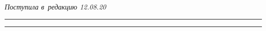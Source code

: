 \vspace*{-3pt}





\hfill{\small\textit{Поступила в~редакцию 12.08.20}}








\vspace*{6pt}





\hrule





\vspace*{2pt}















\hrule





\vspace*{8pt}





\def\tit{ASSESSMENT OF~THE~EFFECT OF~PROCESSES\\ AND~THREADS AFFINITY 


IN~IBM POWER COMPUTING SYSTEMS ON~THE~PARALLEL APPLICATIONS 


PERFORMANCE}





\def\titkol{Assessment of the effect of processes and threads affinity in IBM POWER 




systems} %





\def\aut{S.\,I.~Malkovsky$^1$, A.\,A.~Sorokin$^1$, G.\,I.~Tsoy$^1$, V.\,Y.~Chernykh$^1$, 


and~K.\,I.~Volovich$^2$}





\def\autkol{S.\,I.~Malkovsky, A.\,A.~Sorokin, G.\,I.~Tsoy, et al.}


